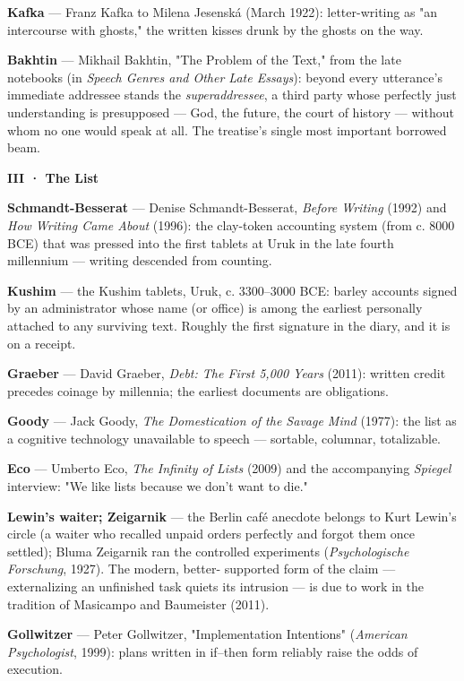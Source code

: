 \documentclass[11pt]{article}
\begin{document}
\textbf{Kafka} — Franz Kafka to Milena Jesenská (March 1922): letter-writing as "an intercourse with ghosts," the written kisses drunk by the ghosts on the way.

\textbf{Bakhtin} — Mikhail Bakhtin, "The Problem of the Text," from the late notebooks (in \emph{Speech Genres and Other Late Essays}): beyond every utterance's immediate addressee stands the \emph{superaddressee}, a third party whose perfectly just understanding is presupposed — God, the future, the court of history — without whom no one would speak at all. The treatise's single most important borrowed beam.

\textbf{III · The List}

\textbf{Schmandt-Besserat} — Denise Schmandt-Besserat, \emph{Before Writing} (1992) and \emph{How Writing Came About} (1996): the clay-token accounting system (from c. 8000 BCE) that was pressed into the first tablets at Uruk in the late fourth millennium — writing descended from counting.

\textbf{Kushim} — the Kushim tablets, Uruk, c. 3300–3000 BCE: barley accounts signed by an administrator whose name (or office) is among the earliest personally attached to any surviving text. Roughly the first signature in the diary, and it is on a receipt.

\textbf{Graeber} — David Graeber, \emph{Debt: The First 5,000 Years} (2011): written credit precedes coinage by millennia; the earliest documents are obligations.

\textbf{Goody} — Jack Goody, \emph{The Domestication of the Savage Mind} (1977): the list as a cognitive technology unavailable to speech — sortable, columnar, totalizable.

\textbf{Eco} — Umberto Eco, \emph{The Infinity of Lists} (2009) and the accompanying \emph{Spiegel} interview: "We like lists because we don't want to die."

\textbf{Lewin's waiter; Zeigarnik} — the Berlin café anecdote belongs to Kurt Lewin's circle (a waiter who recalled unpaid orders perfectly and forgot them once settled); Bluma Zeigarnik ran the controlled experiments (\emph{Psychologische Forschung}, 1927). The modern, better- supported form of the claim — externalizing an unfinished task quiets its intrusion — is due to work in the tradition of Masicampo and Baumeister (2011).

\textbf{Gollwitzer} — Peter Gollwitzer, "Implementation Intentions" (\emph{American Psychologist}, 1999): plans written in if–then form reliably raise the odds of execution.
\end{document}
